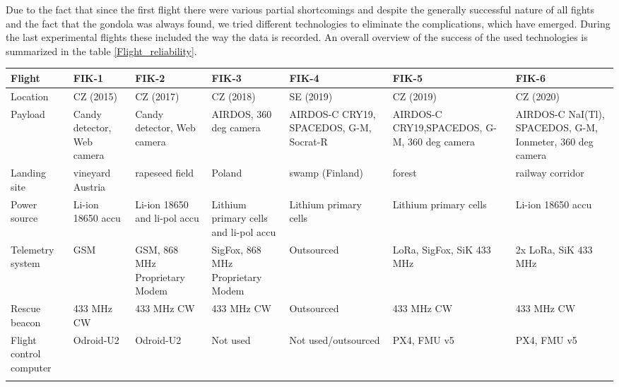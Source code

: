 \documentclass{Rpd}
\begin{document}
Due to the fact that since the first flight there were various partial shortcomings and despite the generally successful nature of all fights and the fact that the gondola was always found, we tried different technologies to eliminate the complications, which have emerged. During the last experimental flights these included the way the data is recorded. An overall overview of the success of the used technologies is summarized in the table \ref{Flight_reliability}.


\begin{table}[t]
{\begin{tabular}{p{} >{\centering\arraybackslash}p{} >{\centering\arraybackslash}p{} >{\centering\arraybackslash}p{} >{\centering\arraybackslash}p{} >{\centering\arraybackslash}p{} >{\centering\arraybackslash}p{}}\toprule
Flight & FIK-1 & FIK-2 & FIK-3 & FIK-4 & FIK-5 & FIK-6 \\\midrule
Location & CZ (2015) & CZ (2017) & CZ (2018) & SE (2019) & CZ (2019) & CZ (2020) \\
Payload & \cellcolor{green} Candy detector, Web camera & \cellcolor{yellow} Candy detector, Web camera & \cellcolor{green} AIRDOS,
360 deg camera & \cellcolor{green} AIRDOS-C CRY19, SPACEDOS, G-M, Socrat-R & \cellcolor{green} AIRDOS-C
CRY19,SPACEDOS, G-M, 360 deg camera & \cellcolor{green} AIRDOS-C NaI(Tl), SPACEDOS, G-M, Ionmeter, 360 deg camera \\
Landing site & \cellcolor{yellow} vineyard Austria & \cellcolor{green} rapeseed field & \cellcolor{red} Poland & \cellcolor{yellow} swamp (Finland) & \cellcolor{green} forest & \cellcolor{red} railway corridor\\
Power source & \cellcolor{green} Li-ion 18650 accu & \cellcolor{yellow} Li-ion 18650 and li-pol accu & \cellcolor{yellow} Lithium primary cells and li-pol accu & \cellcolor{green} Lithium primary cells & \cellcolor{yellow} Lithium primary cells & \cellcolor{green} Li-ion 18650
accu \\
Telemetry system & \cellcolor{red} GSM & \cellcolor{yellow} GSM, 868 MHz Proprietary Modem & \cellcolor{yellow} SigFox,
868 MHz Proprietary Modem &  Outsourced & \cellcolor{green} LoRa, SigFox, SiK 433 MHz & \cellcolor{green} 2x LoRa, SiK 433 MHz \\
Rescue beacon & \cellcolor{green} 433 MHz CW & \cellcolor{green} 433 MHz CW & \cellcolor{green} 433 MHz CW &  Outsourced & \cellcolor{green} 433 MHz CW & \cellcolor{green} 433 MHz CW \\
Flight control computer & \cellcolor{yellow} Odroid-U2 & \cellcolor{yellow} Odroid-U2 & Not used & Not used/outsourced & \cellcolor{green} PX4, FMU v5 & \cellcolor{green} PX4, FMU v5 \\
\botrule
\end{tabular}}{}
\end{table}
\end{document}
